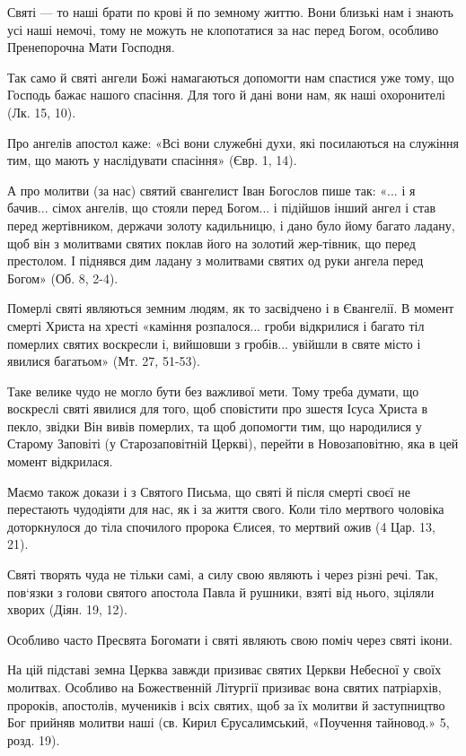 \documentclass[main.tex]{subfiles}
\begin{document}
Святі — то наші брати по крові й по земному життю. Вони близькі нам і знають усі наші немочі, тому не можуть не клопотатися за нас перед Богом, особливо Пренепорочна Мати Господня.

Так само й святі ангели Божі намагаються допомогти нам спастися уже тому, що Господь бажає нашого спасіння. Для того й дані вони нам, як наші охоронителі (Лк. 15, 10).

Про ангелів апостол каже: «Всі вони служебні духи, які посилаються на служіння тим, що мають у наслідувати спасіння» (Євр. 1, 14).

А про молитви (за нас) святий євангелист Іван Богослов пише так: «... і я бачив... сімох ангелів, що стояли перед Богом... і підійшов інший ангел і став перед жертівником, держачи золоту кадильницю, і дано було йому багато ладану, щоб він з молитвами святих поклав його на золотий жер-тівник, що перед престолом. І піднявся дим ладану з молитвами святих од руки ангела перед Богом» (Об. 8, 2-4).

Померлі святі являються земним людям, як то засвідчено і в Євангелії. В момент смерті Христа на хресті «каміння розпалося... гроби відкрилися і багато тіл померлих святих воскресли і, вийшовши з гробів... увійшли в святе місто і явилися багатьом» (Мт. 27, 51-53).

Таке велике чудо не могло бути без важливої мети. Тому треба думати, що воскреслі святі явилися для того, щоб сповістити про зшестя Ісуса Христа в пекло, звідки Він вивів померлих, та щоб допомогти тим, що народилися у Старому Заповіті (у Старозаповітній Церкві), перейти в Новозаповітню, яка в цей момент відкрилася.

Маємо також докази і з Святого Письма, що святі й після смерті своєї не перестають чудодіяти для нас, як і за життя свого. Коли тіло мертвого чоловіка доторкнулося до тіла спочилого пророка Єлисея, то мертвий ожив (4 Цар. 13, 21).

Святі творять чуда не тільки самі, а силу свою являють і через різні речі. Так, пов`язки з голови святого апостола Павла й рушники, взяті від нього, зціляли хворих (Діян. 19, 12).

Особливо часто Пресвята Богомати і святі являють свою поміч через святі ікони.

На цій підставі земна Церква завжди призиває святих Церкви Небесної у своїх молитвах. Особливо на Божественній Літургії призиває вона святих патріархів, пророків, апостолів, мучеників і всіх святих, щоб за їх молитви й заступництво Бог прийняв молитви наші (св. Кирил Єрусалимський, «Поучення тайновод.» 5, розд. 19).
\end{document}
